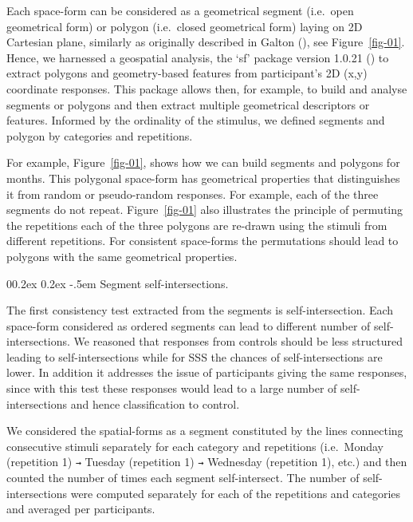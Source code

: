 \documentclass[
  man,
  floatsintext,
  longtable,
  a4paper,
  nolmodern,
  notxfonts,
  notimes,
  colorlinks=true,linkcolor=blue,citecolor=blue,urlcolor=blue]{apa7}
\makeatletter
\renewcommand{\paragraph}{\@startsection{paragraph}{4}{\parindent}%
	{0\baselineskip \@plus 0.2ex \@minus 0.2ex}%
	{-.5em}%
	{\normalfont\normalsize\bfseries\typesectitle}}
\makeatother
\begin{document}
Each space-form can be considered as a geometrical segment (i.e.~open
geometrical form) or polygon (i.e.~closed geometrical form) laying on 2D
Cartesian plane, similarly as originally described in Galton
(), see Figure~\ref{fig-01}.
Hence, we harnessed a geospatial analysis, the `sf' package version
1.0.21 () to extract polygons
and geometry-based features from participant's 2D (x,y) coordinate
responses. This package allows then, for example, to build and analyse
segments or polygons and then extract multiple geometrical descriptors
or features. Informed by the ordinality of the stimulus, we defined
segments and polygon by categories
and repetitions.

For example, Figure~\ref{fig-01}, shows how we can build segments and
polygons for months. This polygonal space-form has geometrical
properties that distinguishes it from random or pseudo-random responses.
For example, each of the three segments do not repeat.
Figure~\ref{fig-01} also illustrates the principle of permuting the
repetitions each of the three polygons are re-drawn using the stimuli
from different repetitions. For consistent space-forms the permutations
should lead to polygons with the same geometrical properties.

\paragraph{Segment
self-intersections.}\label{segment-self-intersections}

The first consistency test extracted from the segments is
self-intersection. Each space-form considered as ordered segments can
lead to different number of self-intersections. We reasoned that
responses from controls should be less structured leading to
self-intersections while for SSS the chances of self-intersections are
lower. In addition it addresses the issue of participants giving the
same responses, since with this test these responses would lead to a
large number of self-intersections and hence classification to control.

We considered the spatial-forms as a segment constituted by the lines
connecting consecutive stimuli separately for each category and
repetitions (i.e.~Monday (repetition 1) \texttt{→} Tuesday (repetition
1) \texttt{→} Wednesday (repetition 1), etc.) and then counted the
number of times each segment self-intersect. The number of
self-intersections were computed separately for each of the repetitions
and categories and averaged per participants.
\end{document}
